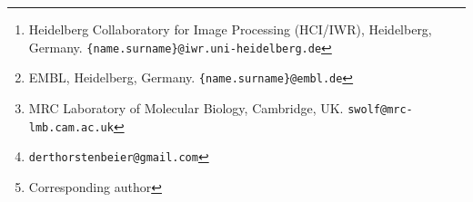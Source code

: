 \documentclass[10pt,twocolumn,letterpaper]{article}
\theoremstyle{definition}
\theoremstyle{remark}
\begin{document}
\author{Alberto Bailoni \thanks{Heidelberg Collaboratory for Image Processing (HCI/IWR), Heidelberg, Germany. {\tt \{name.surname\}@iwr.uni-heidelberg.de}}~~\thanks{EMBL, Heidelberg, Germany. {\tt \{name.surname\}@embl.de}}
\and Constantin Pape \footnotemark[1]~~\footnotemark[2]
\and Nathan H\"utsch \footnotemark[1]
\and Steffen Wolf \thanks{MRC Laboratory of Molecular Biology, Cambridge, UK.  {\tt swolf@mrc-lmb.cam.ac.uk}}
\and Thorsten Beier \thanks{{\tt derthorstenbeier@gmail.com}}
\and Anna Kreshuk \footnotemark[2]
\and Fred A. Hamprecht \footnotemark[1]~~\thanks{Corresponding author}
}


\maketitle











% 



{\small


}

\clearpage


    
\end{document}
